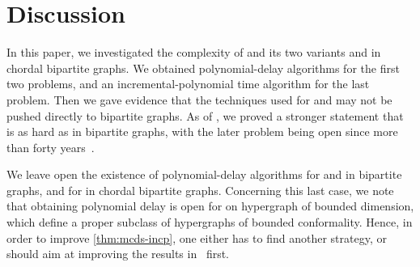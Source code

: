 \section{Discussion}\label{sec:conclusion}

In this paper, we investigated the complexity of \domenum{} and its two variants \tdomenum{} and \cdomenum{} in chordal bipartite graphs.
We obtained polynomial-delay algorithms for the first two problems, and an incremental-polynomial time algorithm for the last problem.
Then we gave evidence that the techniques used for \domenum{} and \tdomenum{} may not be pushed directly to bipartite graphs.
As of \cdomenum{}, we proved a stronger statement that \cdomenum{} is as hard as \transenum{} in bipartite graphs, with the later problem being open since more than forty years~\cite{eiter1995identifying}.

We leave open the existence of polynomial-delay algorithms for \domenum{} and \tdomenum{} in bipartite graphs, and for \cdomenum{} in chordal bipartite graphs.
Concerning this last case, we note that obtaining polynomial delay is open for \transenum{} on hypergraph of bounded dimension, which define a proper subclass of hypergraphs of bounded conformality.
Hence, in order to improve \autoref{thm:mcds-incp}, one either has to find another strategy, or should aim at improving the results in~\cite{eiter1995identifying,khachiyan2007conformality} first.
